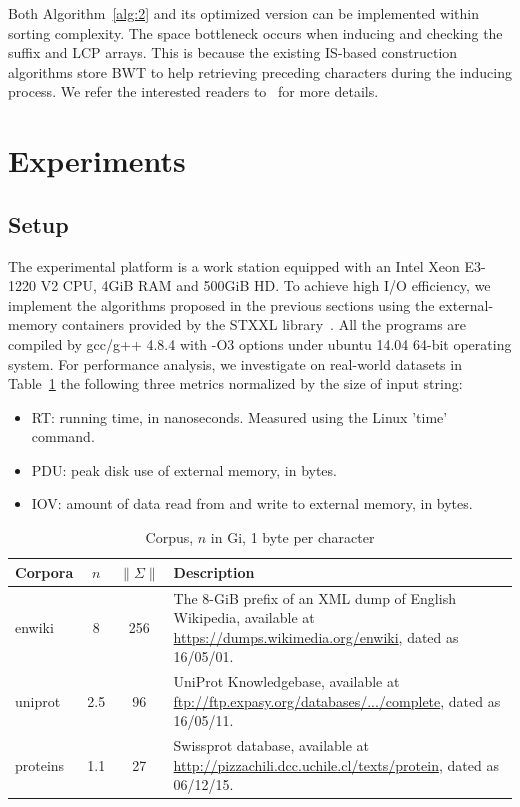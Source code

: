 \documentclass[10pt,journal,compsoc]{IEEEtran}
\begin{document}
Both Algorithm~\ref{alg:2} and its optimized version can be implemented within sorting complexity. The space bottleneck occurs when inducing and checking the suffix and LCP arrays. This is because the existing IS-based construction algorithms store BWT to help retrieving preceding characters during the inducing process. We refer the interested readers to~\cite{Karkkainen2013} for more details.

\section{Experiments} \label{sec:experiment}

\subsection{Setup} \label{sec:experiment:setup}

The experimental platform is a work station equipped with an Intel Xeon E3-1220 V2 CPU, 4GiB RAM and 500GiB HD. To achieve high I/O efficiency, we implement the algorithms proposed in the previous sections using the external-memory containers provided by the STXXL library~\cite{Dementiev2007}. All the programs are compiled by gcc/g++ 4.8.4 with -O3 options under ubuntu 14.04 64-bit operating system. For performance analysis, we investigate on real-world datasets in Table~\ref{tbl:1} the following three metrics normalized by the size of input string:

\begin{itemize}
	
	\item RT: running time, in nanoseconds. Measured using the Linux 'time' command.
	
	\item PDU: peak disk use of external memory, in bytes.
	
	\item IOV: amount of data read from and write to external memory, in bytes.
	
\end{itemize}
	
\renewcommand\arraystretch{1.3}
\begin{table}[!t]
	\caption{Corpus, $n$ in Gi, 1 byte per character}
	\label{tbl:1}
	\centering
	\begin{tabular}{|l|c|c|p{10cm}|}
		\hline
		Corpora & \multicolumn{1}{c|}{$n$} & \multicolumn{1}{c|}{$\|\Sigma\|$} & Description \\\hline
		enwiki & 8 & 256 & The 8-GiB prefix of an XML dump of English Wikipedia, available at \url{https://dumps.wikimedia.org/enwiki}, dated as 16/05/01. \\\hline	
		uniprot & 2.5 & 96 & UniProt Knowledgebase, available at \url{ftp://ftp.expasy.org/databases/.../complete}, dated as 16/05/11. \\\hline
		proteins & 1.1 & 27 & Swissprot database, available at \url{http://pizzachili.dcc.uchile.cl/texts/protein}, dated as 06/12/15. \\\hline
	\end{tabular}
\end{table}
\end{document}
